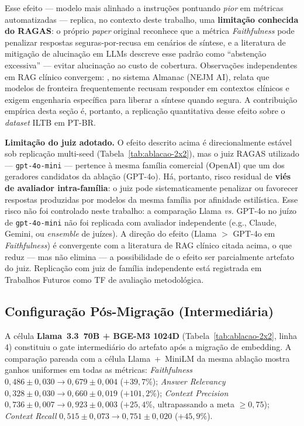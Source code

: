 \documentclass[
  12pt,
  oneside,
  a4paper,
  english,
  brazil
]{abntex2}
\begin{document}
Esse efeito --- modelo mais alinhado a instruções pontuando \emph{pior} em
métricas automatizadas --- replica, no contexto deste trabalho, uma
\textbf{limitação conhecida do RAGAS}: o próprio \emph{paper} original
\cite{es2024} reconhece que a métrica \textit{Faithfulness} pode
penalizar respostas seguras-por-recusa em cenários de síntese, e a
literatura de mitigação de alucinação em LLMs
\cite{huang2023halucination, ocaf2024} descreve esse padrão como
``abstenção excessiva'' --- evitar alucinação ao custo de cobertura.
Observações independentes em RAG clínico convergem: \citeauthor{zakka2024almanac}
\cite{zakka2024almanac}, no sistema Almanac (NEJM AI), relata que
modelos de fronteira frequentemente recusam responder em contextos
clínicos e exigem engenharia específica para liberar a síntese quando
segura. A contribuição empírica desta seção é, portanto, a replicação
quantitativa desse efeito sobre o \textit{dataset} ILTB em PT-BR.

\textbf{Limitação do juiz adotado.} O efeito descrito acima é direcionalmente
estável sob replicação multi-seed (Tabela~\ref{tab:ablacao-2x2}), mas o
juiz RAGAS utilizado --- \texttt{gpt-4o-mini} --- pertence à mesma
família comercial (OpenAI) que um dos geradores candidatos da ablação
(GPT-4o). Há, portanto, risco residual de \textbf{viés de avaliador
intra-família}: o juiz pode sistematicamente penalizar ou favorecer
respostas produzidas por modelos da mesma família por afinidade
estilística. Esse risco não foi controlado neste trabalho: a comparação
Llama \emph{vs.} GPT-4o no juízo de \texttt{gpt-4o-mini} não foi
replicada com avaliador independente (e.g., Claude, Gemini, ou
\textit{ensemble} de juízes). A direção do efeito (Llama $>$ GPT-4o em
\textit{Faithfulness}) é convergente com a literatura de RAG clínico
citada acima, o que reduz --- mas não elimina --- a possibilidade de o
efeito ser parcialmente artefato do juiz. Replicação com juiz de família
independente está registrada em Trabalhos Futuros como TF de avaliação
metodológica.

\subsection{Configuração Pós-Migração (Intermediária)}
\label{sec:gate-pos-migracao}

A célula \textbf{Llama~3.3~70B + BGE-M3 1024D} (Tabela~\ref{tab:ablacao-2x2},
linha 4) constituiu o gate intermediário do artefato após a migração de
embedding. A comparação pareada com a célula Llama~+~MiniLM da mesma ablação
mostra ganhos uniformes em todas as métricas: \textit{Faithfulness}
$0{,}486 \pm 0{,}030 \to 0{,}679 \pm 0{,}004$ ($+39{,}7\%$);
\textit{Answer Relevancy} $0{,}328 \pm 0{,}030 \to 0{,}660 \pm 0{,}019$
($+101{,}2\%$); \textit{Context Precision}
$0{,}736 \pm 0{,}007 \to 0{,}923 \pm 0{,}003$ ($+25{,}4\%$, ultrapassando
a meta $\geq 0{,}75$); \textit{Context Recall}
$0{,}515 \pm 0{,}073 \to 0{,}751 \pm 0{,}020$ ($+45{,}9\%$).
\end{document}
